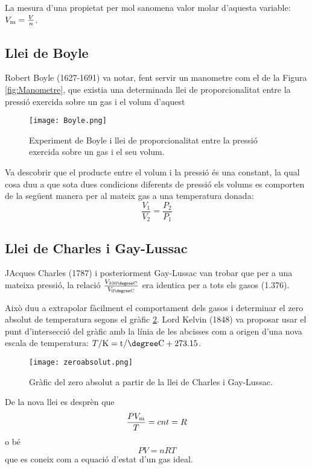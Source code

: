 La mesura d'una propietat per mol sanomena valor molar d'aquesta variable: $V_{\rm m} = \frac{V}{n}$. 
\subsection{Llei de Boyle}

Robert Boyle (1627-1691) va notar, fent servir un manometre com el de la Figura \ref{fig:Manometre}, que existia una determinada llei de proporcionalitat entre la pressió exercida sobre un gas i el volum d'aquest
\begin{figure}[h]
\centering
\texttt{[image: Boyle.png]}
\caption{Experiment de Boyle i llei de proporcionalitat entre la pressió exercida sobre un gas i el seu volum.}
\label{fig:Boyle}
\end{figure}
Va descobrir que el producte entre el volum i la pressió és una constant, la qual cosa duu a que sota dues condicions diferents de pressió els volums es comporten de la següent manera per al mateix gas a una temperatura donada:
\[
\frac{V_1}{V_2}=\frac{P_2}{P_1}
\]


\subsection{Llei de Charles i Gay-Lussac}

JAcques Charles (1787) i posteriorment Gay-Lussac van trobar que per a una mateixa pressió, la relació $\frac{V_{100 \degree C}}{V_{0 \degree C}}$ era identica per a tots els gasos (1.376).

Això duu a extrapolar fàcilment el comportament dels gasos i determinar el zero absolut de temperatura segons el gràfic \ref{fig:zeroabsolut}. Lord Kelvin (1848) va proposar usar el punt d'intersecció del gràfic amb la línia de les abcisses com a origen d'una nova escala de temperatura: $T/\rm{K} = t/\degree \rm{C} + 273.15$.
\begin{figure}[h]
\centering
\texttt{[image: zeroabsolut.png]}
\caption{Gràfic del zero absolut a partir de la llei de Charles i Gay-Lussac.}
\label{fig:zeroabsolut}
\end{figure}

De la nova llei es desprèn que 
\[\frac{P V_{\rm m}}{T}= cnt = R\]
o bé
\[P V = n R T\]
que es coneix com a equació d'estat d'un gas ideal.

